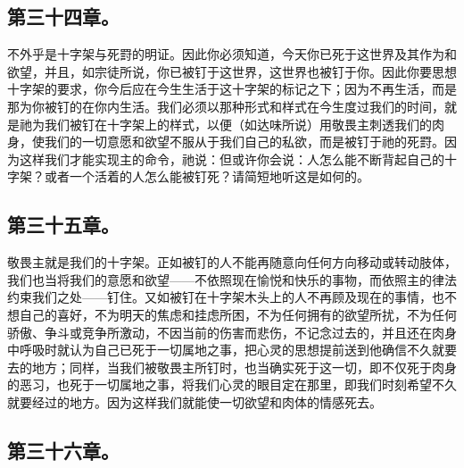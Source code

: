 
\subsection{第三十四章。}

\par

不外乎是十字架与死罸的明证。因此你必须知道，今天你已死于这世界及其作为和欲望，并且，如宗徒所说，你已被钉于这世界，这世界也被钉于你。因此你要思想十字架的要求，你今后应在今生生活于这十字架的标记之下；因为不再生活，而是那为你被钉的在你内生活。我们必须以那种形式和样式在今生度过我们的时间，就是祂为我们被钉在十字架上的样式，以便（如达味所说）用敬畏主刺透我们的肉身，使我们的一切意愿和欲望不服从于我们自己的私欲，而是被钉于祂的死罸。因为这样我们才能实现主的命令，祂说：但或许你会说：人怎么能不断背起自己的十字架？或者一个活着的人怎么能被钉死？请简短地听这是如何的。\par


\subsection{第三十五章。}

\par

敬畏主就是我们的十字架。正如被钉的人不能再随意向任何方向移动或转动肢体，我们也当将我们的意愿和欲望——不依照现在愉悦和快乐的事物，而依照主的律法约束我们之处——钉住。又如被钉在十字架木头上的人不再顾及现在的事情，也不想自己的喜好，不为明天的焦虑和挂虑所困，不为任何拥有的欲望所扰，不为任何骄傲、争斗或竞争所激动，不因当前的伤害而悲伤，不记念过去的，并且还在肉身中呼吸时就认为自己已死于一切属地之事，把心灵的思想提前送到他确信不久就要去的地方；同样，当我们被敬畏主所钉时，也当确实死于这一切，即不仅死于肉身的恶习，也死于一切属地之事，将我们心灵的眼目定在那里，即我们时刻希望不久就要经过的地方。因为这样我们就能使一切欲望和肉体的情感死去。\par


\subsection{第三十六章。}

